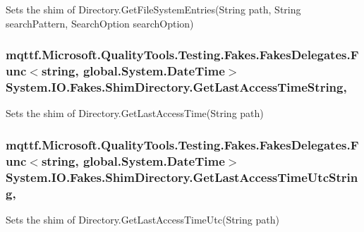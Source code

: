 Sets the shim of Directory.\-Get\-File\-System\-Entries(\-String path, String search\-Pattern, Search\-Option search\-Option)

\hypertarget{class_system_1_1_i_o_1_1_fakes_1_1_shim_directory_a5e720455e9f65b93c403fc2871a1dc78}{
\subsubsection[{Get\-Last\-Access\-Time\-String}]{\setlength{\rightskip}{0pt plus 5cm}mqttf.\-Microsoft.\-Quality\-Tools.\-Testing.\-Fakes.\-Fakes\-Delegates.\-Func$<$string, global.\-System.\-Date\-Time$>$ System.\-I\-O.\-Fakes.\-Shim\-Directory.\-Get\-Last\-Access\-Time\-String\hspace{0.3cm}{\ttfamily [static]}, {\ttfamily [set]}}}\label{class_system_1_1_i_o_1_1_fakes_1_1_shim_directory_a5e720455e9f65b93c403fc2871a1dc78}


Sets the shim of Directory.\-Get\-Last\-Access\-Time(\-String path)

\hypertarget{class_system_1_1_i_o_1_1_fakes_1_1_shim_directory_a3b23f718c9a672da59d5cceb7ac35e11}{
\subsubsection[{Get\-Last\-Access\-Time\-Utc\-String}]{\setlength{\rightskip}{0pt plus 5cm}mqttf.\-Microsoft.\-Quality\-Tools.\-Testing.\-Fakes.\-Fakes\-Delegates.\-Func$<$string, global.\-System.\-Date\-Time$>$ System.\-I\-O.\-Fakes.\-Shim\-Directory.\-Get\-Last\-Access\-Time\-Utc\-String\hspace{0.3cm}{\ttfamily [static]}, {\ttfamily [set]}}}\label{class_system_1_1_i_o_1_1_fakes_1_1_shim_directory_a3b23f718c9a672da59d5cceb7ac35e11}


Sets the shim of Directory.\-Get\-Last\-Access\-Time\-Utc(\-String path)

